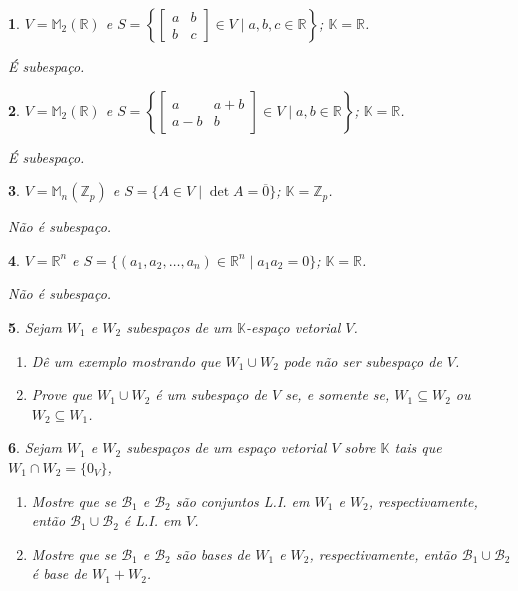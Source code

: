 \documentclass[12pt]{exam}
\newtheorem{exercicio}{}
\newcommand{\integer}{\mathbb{Z}}
\newcommand{\real}{\mathbb{R}}
\newcommand{\cp}[1]{\mathbb{#1}}
\begin{document}
\begin{exercicio}
$V = \cp{M}_2(\real)$ e $S = \left\{\begin{bmatrix} a & b\\ b & c\end{bmatrix} \in V \mid a, b, c \in \real\right\}$; $\cp{K} = \real$.
\begin{solucao}
  \'E subespa\c{c}o.
\end{solucao}
\end{exercicio}

\begin{exercicio}
$V = \cp{M}_2(\real)$ e $S = \left\{\begin{bmatrix} a & a+b\\ a-b & b\end{bmatrix} \in V \mid a, b \in \real \right\}$; $\cp{K} = \real$.
\begin{solucao}
  \'E subespa\c{c}o.
\end{solucao}
\end{exercicio}

\begin{exercicio}
$V = \cp{M}_n(\integer_p)$ e $S = \{A \in V \mid \det A = \overline{0}\}$; $\cp{K} = \integer_p$.
\begin{solucao}
  N\~ao \'e subespa\c{c}o.
\end{solucao}
\end{exercicio}


\begin{exercicio}\label{subespacofim}
$V = \real^n$ e $S = \{(a_1, a_2, \dots, a_n) \in \real^n \mid a_1a_2 = 0\}$; $\cp{K} = \real$.
\begin{solucao}
  N\~ao \'e subespa\c{c}o.
\end{solucao}
\end{exercicio}

\begin{exercicio}
  Sejam $W_1$ e $W_2$ subespa\c{c}os de um $\cp{K}$-espa\c{c}o vetorial $V$.
  \begin{enumerate}[label={\alph*})]
    \item D\^e um exemplo mostrando que $W_1 \cup W_2$ pode n\~ao ser subespa\c{c}o de $V$.
    \item Prove que $W_1 \cup W_2$ \'e um subespa\c{c}o de $V$ se, e somente se, $W_1 \subseteq W_2$ ou $W_2 \subseteq W_1$.
  \end{enumerate}
\end{exercicio}

\begin{exercicio}
  Sejam $W_1$ e $W_2$ subespa\c{c}os de um espa\c{c}o vetorial $V$ sobre $\cp{K}$ tais que $W_1 \cap W_2 = \{0_V\}$,
  \begin{enumerate}[label={\alph*})]
    \item Mostre que se $\mathcal{B}_1$ e $\mathcal{B}_2$ s\~ao conjuntos L.I. em $W_1$ e $W_2$, respectivamente, ent\~ao $\mathcal{B}_1 \cup \mathcal{B}_2$ \'e L.I. em $V$.
    \item Mostre que se $\mathcal{B}_1$ e $\mathcal{B}_2$ s\~ao bases de $W_1$ e $W_2$, respectivamente, ent\~ao $\mathcal{B}_1 \cup \mathcal{B}_2$ \'e base de $W_1 + W_2$.
  \end{enumerate}
\end{exercicio}
\end{document}
